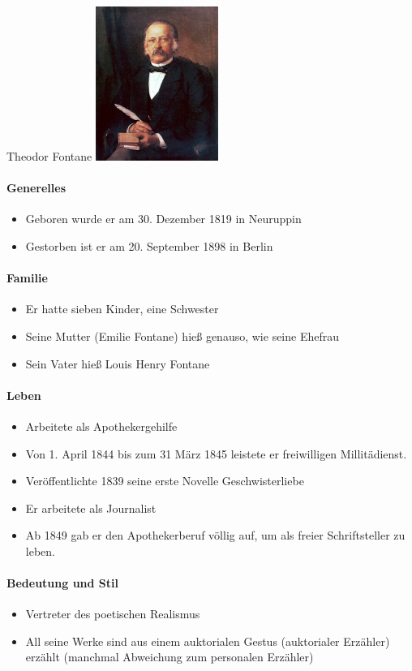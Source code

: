 \documentclass[12pt,a4paper]{report}
\begin{document}
	\Huge Theodor Fontane
	\hspace{2cm}
	\includegraphics[width=4cm]{IMG_1135.jpeg}

	\vspace{1cm}
	\normalsize
	
	\paragraph{Generelles}
	
	\begin{itemize}
		\item Geboren wurde er am 30. Dezember 1819 in Neuruppin
		\item Gestorben ist er am 20. September 1898 in Berlin
	\end{itemize}
	
	\paragraph{Familie}
	
	\begin{itemize}
		\item Er hatte sieben Kinder, eine Schwester
		\item Seine Mutter (Emilie Fontane) hieß genauso, wie seine Ehefrau
		\item Sein Vater hieß Louis Henry Fontane
	\end{itemize}
	
	\paragraph{Leben}
	
	\begin{itemize}
		\item Arbeitete als Apothekergehilfe
		\item Von 1. April 1844 bis zum 31 März 1845 leistete er freiwilligen Millitädienst.
		\item Veröffentlichte 1839 seine erste Novelle \dq Geschwisterliebe\dq
		\item Er arbeitete als Journalist
		\item Ab 1849 gab er den Apothekerberuf völlig auf, um als freier Schriftsteller zu leben.
	\end{itemize}
	
	\paragraph{Bedeutung und Stil}
	
	\begin{itemize}
		\item Vertreter des poetischen Realismus
		\item All seine Werke sind aus einem auktorialen Gestus (auktorialer Erzähler) erzählt (manchmal Abweichung zum personalen Erzähler)
	\end{itemize}

	
\end{document}
